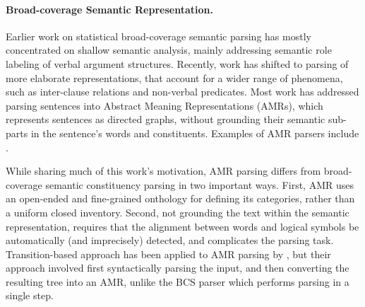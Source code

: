 \documentclass[11pt]{article}
\begin{document}
\paragraph{Broad-coverage Semantic Representation.}
Earlier work on statistical broad-coverage semantic parsing has mostly
concentrated on shallow semantic analysis, mainly addressing semantic
role labeling of verbal argument structures. 
Recently, work has shifted to parsing of more elaborate representations, that account
for a wider range of phenomena, such as inter-clause relations and non-verbal predicates.
Most work has addressed parsing sentences into Abstract Meaning Representations (AMRs),
which represents sentences as directed graphs, without
grounding their semantic sub-parts in the sentence's words and constituents.
Examples of AMR parsers include 
\cite{flanigan2014discriminative,vanderwende2015amr,pust2015parsing,artzi2015broad}. 

While sharing much of this work's motivation, AMR parsing differs from broad-coverage
semantic constituency parsing in two important ways.
First, AMR uses an open-ended and fine-grained onthology for defining its categories,
rather than a uniform closed inventory.
Second, not grounding the text within the semantic representation, 
requires that the alignment between words and logical symbols be automatically
(and imprecisely) detected, and complicates the parsing task.
Transition-based approach has been applied to AMR parsing by ,
but their approach involved first syntactically parsing the input, and then converting
the resulting tree into an AMR, unlike the \textsc{BCS} parser which performs parsing in a single step.
\end{document}
